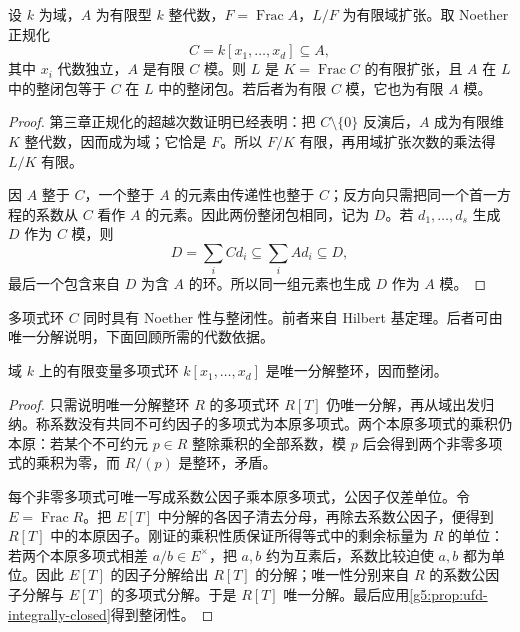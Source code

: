\begin{proposition}\label{g5:prop:normalization-polynomial-reduction}
	设 \(k\) 为域，\(A\) 为有限型 \(k\) 整代数，\(F=\operatorname{Frac}A\)，\(L/F\) 为有限域扩张。取 Noether 正规化
	\[
		C=k[x_1,\ldots,x_d]\subseteq A,
	\]
	其中 \(x_i\) 代数独立，\(A\) 是有限 \(C\) 模。则 \(L\) 是 \(K=\operatorname{Frac}C\) 的有限扩张，且 \(A\) 在 \(L\) 中的整闭包等于 \(C\) 在 \(L\) 中的整闭包。若后者为有限 \(C\) 模，它也为有限 \(A\) 模。
\end{proposition}
\begin{proof}
	第三章正规化的超越次数证明已经表明：把 \(C\setminus\{0\}\) 反演后，\(A\) 成为有限维 \(K\) 整代数，因而成为域；它恰是 \(F\)。所以 \(F/K\) 有限，再用域扩张次数的乘法得 \(L/K\) 有限。

	因 \(A\) 整于 \(C\)，一个整于 \(A\) 的元素由传递性也整于 \(C\)；反方向只需把同一个首一方程的系数从 \(C\) 看作 \(A\) 的元素。因此两份整闭包相同，记为 \(D\)。若 \(d_1,\ldots,d_s\) 生成 \(D\) 作为 \(C\) 模，则
	\[
		D=\sum_i Cd_i\subseteq\sum_i Ad_i\subseteq D,
	\]
	最后一个包含来自 \(D\) 为含 \(A\) 的环。所以同一组元素也生成 \(D\) 作为 \(A\) 模。
\end{proof}

多项式环 \(C\) 同时具有 Noether 性与整闭性。前者来自 Hilbert 基定理。后者可由唯一分解说明，下面回顾所需的代数依据。

\begin{lemma}\label{g5:lem:polynomial-ring-normal}
	域 \(k\) 上的有限变量多项式环 \(k[x_1,\ldots,x_d]\) 是唯一分解整环，因而整闭。
\end{lemma}
\begin{proof}
	只需说明唯一分解整环 \(R\) 的多项式环 \(R[T]\) 仍唯一分解，再从域出发归纳。称系数没有共同不可约因子的多项式为本原多项式。两个本原多项式的乘积仍本原：若某个不可约元 \(p\in R\) 整除乘积的全部系数，模 \(p\) 后会得到两个非零多项式的乘积为零，而 \(R/(p)\) 是整环，矛盾。

	每个非零多项式可唯一写成系数公因子乘本原多项式，公因子仅差单位。令 \(E=\operatorname{Frac}R\)。把 \(E[T]\) 中分解的各因子清去分母，再除去系数公因子，便得到 \(R[T]\) 中的本原因子。刚证的乘积性质保证所得等式中的剩余标量为 \(R\) 的单位：若两个本原多项式相差 \(a/b\in E^\times\)，把 \(a,b\) 约为互素后，系数比较迫使 \(a,b\) 都为单位。因此 \(E[T]\) 的因子分解给出 \(R[T]\) 的分解；唯一性分别来自 \(R\) 的系数公因子分解与 \(E[T]\) 的多项式分解。于是 \(R[T]\) 唯一分解。最后应用\cref{g5:prop:ufd-integrally-closed}得到整闭性。
\end{proof}

